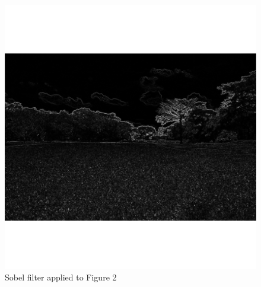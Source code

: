 \documentclass[12pt]{article}
\begin{document}
\begin{figure}[h]
\centering
\includegraphics[scale = 0.45]{img/landscape_Sobel}
\caption{Sobel filter applied to Figure 2}
\end{figure}
\end{document}
